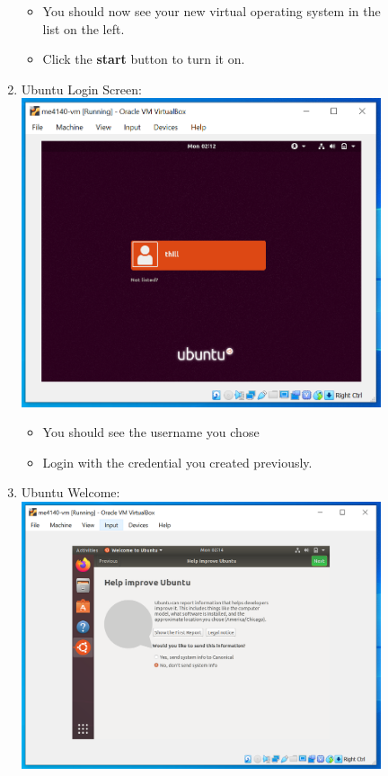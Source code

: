 \documentclass[12pt]{article}
\begin{document}
\begin{description}
\begin{description}
\begin{enumerate}[label=\alph*)]
      		 \begin{itemize}
        	\item You should now see your new virtual operating system in the list on the left. 
        	\item Click the {\bf start} button to turn it on. 
    		\end{itemize} 
    	
    	\newpage
    		\item Ubuntu Login Screen: \vspace{5mm} \\
      		\includegraphics[scale=.55]{Capture23.png}
      		 \begin{itemize}
        	\item You should see the username you chose 
        	\item Login with the credential you created previously.
    		\end{itemize} 
    		 \vspace{5mm} 
    		\item Ubuntu Welcome: \vspace{5mm} \\
      		\includegraphics[scale=.55]{Capture24.png}

\end{enumerate}
\end{description}
\end{description}
\end{document}
